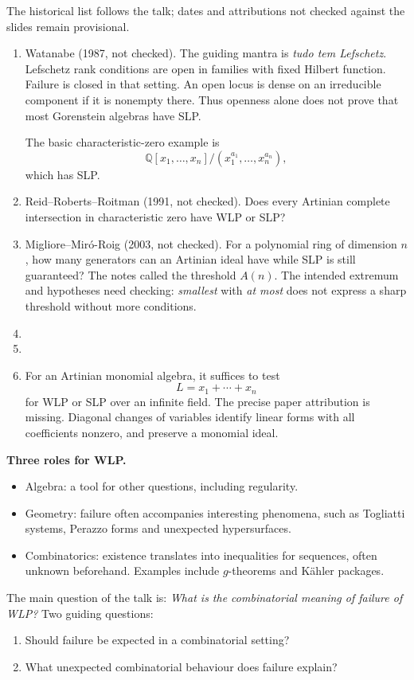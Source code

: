 The historical list follows the talk;
dates and attributions not checked
against the slides remain provisional.
\begin{enumerate}
\item Watanabe (1987, not checked).
The guiding mantra is
\emph{tudo tem Lefschetz}.
Lefschetz rank conditions are open in
families with fixed Hilbert function.
Failure is closed in that setting.
An open locus is dense on an irreducible
component if it is nonempty there.
Thus openness alone does not prove that
most Gorenstein algebras have SLP.

The basic characteristic-zero example is
$$
\mathbb{Q}[x_1,\ldots,x_n]/
(x_1^{a_1},\ldots,x_n^{a_n}),
$$
which has SLP.
\item Reid--Roberts--Roitman (1991,
not checked).
Does every Artinian complete intersection
in characteristic zero have WLP or SLP?
\item Migliore--Miró-Roig (2003,
not checked).
For a polynomial ring of dimension $n$,
how many generators can an Artinian ideal
have while SLP is still guaranteed?
The notes called the threshold $A(n)$.
The intended extremum and hypotheses
need checking: \emph{smallest} with
\emph{at most} does not express a sharp
threshold without more conditions.
\item [Notes incomplete.]
\item [Notes incomplete.]
\item For an Artinian monomial algebra,
it suffices to test
$$
L=x_1+\cdots+x_n
$$
for WLP or SLP over an infinite field.
The precise paper attribution is missing.
Diagonal changes of variables identify
linear forms with all coefficients
nonzero, and preserve a monomial ideal.
\end{enumerate}

\medskip\noindent
\textbf{Three roles for WLP.}
\begin{itemize}
\item Algebra: a tool for other questions,
including regularity.
\item Geometry: failure often accompanies
interesting phenomena, such as Togliatti
systems, Perazzo forms and unexpected
hypersurfaces.
\item Combinatorics: existence translates
into inequalities for sequences, often
unknown beforehand. Examples include
$g$-theorems and Kähler packages.
\end{itemize}

The main question of the talk is:
\emph{What is the combinatorial meaning
of failure of WLP?}
Two guiding questions:
\begin{enumerate}
\item Should failure be expected in a
combinatorial setting?
\item What unexpected combinatorial
behaviour does failure explain?
\end{enumerate}


